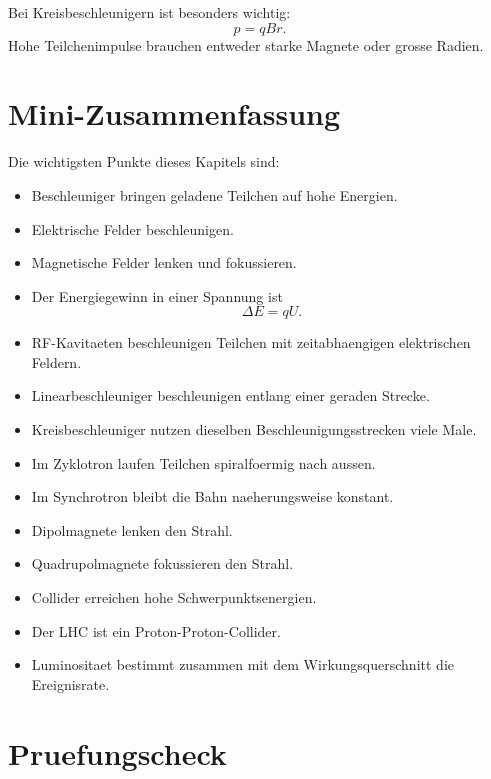 \begin{examtipbox}
Bei Kreisbeschleunigern ist besonders wichtig:
\[
    p=qBr.
\]
Hohe Teilchenimpulse brauchen entweder starke Magnete oder grosse Radien.
\end{examtipbox}

\section{Mini-Zusammenfassung}

\begin{notebox}
Die wichtigsten Punkte dieses Kapitels sind:
\begin{itemize}
    \item Beschleuniger bringen geladene Teilchen auf hohe Energien.
    \item Elektrische Felder beschleunigen.
    \item Magnetische Felder lenken und fokussieren.
    \item Der Energiegewinn in einer Spannung ist
    \[
        \Delta E=qU.
    \]
    \item RF-Kavitaeten beschleunigen Teilchen mit zeitabhaengigen elektrischen Feldern.
    \item Linearbeschleuniger beschleunigen entlang einer geraden Strecke.
    \item Kreisbeschleuniger nutzen dieselben Beschleunigungsstrecken viele Male.
    \item Im Zyklotron laufen Teilchen spiralfoermig nach aussen.
    \item Im Synchrotron bleibt die Bahn naeherungsweise konstant.
    \item Dipolmagnete lenken den Strahl.
    \item Quadrupolmagnete fokussieren den Strahl.
    \item Collider erreichen hohe Schwerpunktsenergien.
    \item Der LHC ist ein Proton-Proton-Collider.
    \item Luminositaet bestimmt zusammen mit dem Wirkungsquerschnitt die Ereignisrate.
\end{itemize}
\end{notebox}

\section{Pruefungscheck}

